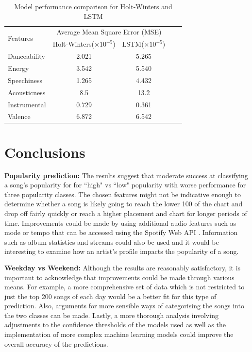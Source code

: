 \documentclass{article}
\begin{document}
\begin{table}[htbp]
    \centering
    \small
    \caption{Model performance comparison for Holt-Winters and LSTM}
    \label{tab:predict_model_comparison}
    \begin{tabular}{lcccc}
        \toprule
        \multirow{2}{*}{Features} & \multicolumn{2}{c}{Average Mean Square Error (MSE)} \\
        \cmidrule(lr){2-3} 
         & Holt-Winters($\times 10^{-5}$) & LSTM($\times 10^{-5}$) \\
        \midrule
        Danceability & 2.021 & 5.265 \\
        Energy & 3.542 & 5.540 \\
        Speechiness & 1.265 & 4.432 \\
        Acousticness & 8.5 & 13.2  \\
        Instrumental & 0.729 & 0.361\\
        Valence & 6.872 & 6.542\\
        \bottomrule
    \end{tabular}
\end{table}



\section{Conclusions}

\textbf{Popularity prediction:} The results suggest that moderate success at classifying a song's popularity for for ``high" vs ``low" popularity with worse performance for three popularity classes. The chosen features might not be indicative enough to determine whether a song is likely going to reach the lower 100 of the chart and drop off fairly quickly or reach a higher placement and chart for longer periods of time.
Improvements could be made by using additional audio features such as mode or tempo that can be accessed using the Spotify Web API \cite{spotify_web}.
Information such as album statistics and streams could also be used and it would be interesting to examine how an artist's profile impacts the popularity of a song. 

\textbf{Weekday vs Weekend:} Although the results are reasonably satisfactory, it is important to acknowledge that improvements could be made through various means. For example, a more comprehensive set of data which is not restricted to just the top 200 songs of each day would be a better fit for this type of prediction. Also, arguments for more sensible ways of categorising the songs into the two classes can be made. Lastly, a more thorough analysis involving adjustments to the confidence thresholds of the models used as well as the implementation of more complex machine learning models could improve the overall accuracy of the predictions.
\end{document}
